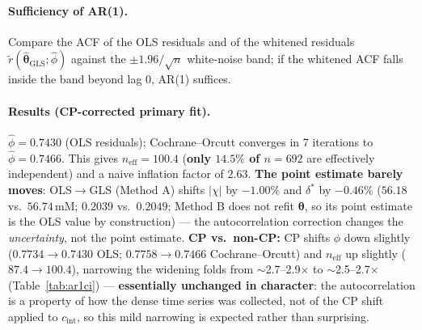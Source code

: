 \documentclass[11pt]{article}
\newcommand{\dstar}{\delta^{*}}
\newcommand{\cint}{c_{\mathrm{int}}}
\begin{document}
\paragraph{Sufficiency of AR(1).} Compare the ACF of the OLS residuals and of
the whitened residuals $\tilde r(\hat{\boldsymbol\theta}_{\text{GLS}};\hat\phi)$
against the $\pm1.96/\sqrt n$ white-noise band; if the whitened ACF falls
inside the band beyond lag 0, AR(1) suffices.

\paragraph{Results (CP-corrected primary fit).} $\hat\phi=0.7430$ (OLS
residuals); Cochrane--Orcutt converges in 7 iterations to $\hat\phi=0.7466$.
This gives $n_{\mathrm{eff}}=100.4$ (\textbf{only $14.5\%$ of $n=692$} are
effectively independent) and a naive inflation factor of $2.63$.
\textbf{The point estimate barely moves}: OLS$\to$GLS (Method A) shifts
$|\chi|$ by $-1.00\%$ and $\dstar$ by $-0.46\%$ ($56.18$ vs.\ $56.74$\,mM;
$0.2039$ vs.\ $0.2049$; Method B does not refit $\boldsymbol\theta$, so its
point estimate is the OLS value by construction) --- the autocorrelation
correction changes the \emph{uncertainty}, not the point estimate.
\textbf{CP vs.\ non-CP:} CP shifts $\hat\phi$ down slightly ($0.7734\to0.7430$
OLS; $0.7758\to0.7466$ Cochrane--Orcutt) and $n_{\mathrm{eff}}$ up slightly
($87.4\to100.4$), narrowing the widening folds from $\sim$2.7--2.9$\times$ to
$\sim$2.5--2.7$\times$ (Table~\ref{tab:ar1ci}) --- \textbf{essentially
unchanged in character}: the autocorrelation is a property of how the dense
time series was collected, not of the CP shift applied to $\cint$, so this
mild narrowing is expected rather than surprising.
\end{document}
